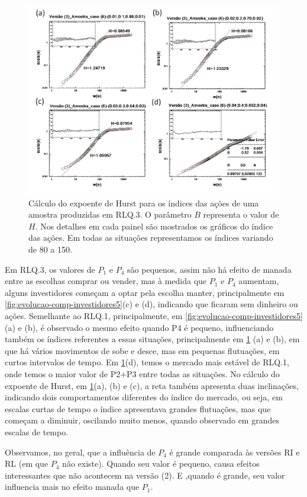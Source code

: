 \documentclass[brazil,ruledheader]{abnt}
\begin{document}
\begin{figure}[!h]
\centering
\includegraphics[width=0.8\linewidth]{Figuras/23.jpg}
\caption[Cálculo do expoente de Hurst para os índices em RLQ.3]{Cálculo do
expoente de Hurst para os índices das ações de uma amostra
produzidas em RLQ.3.  O parâmetro $B$ representa o valor de
$H$. Nos detalhes em cada painel são mostrados os gráficos do índice das ações.
Em todas as situações representamos os índices variando de 80 a 150.}
\label{fig:calculo-exp-hurst9}
\end{figure}

Em RLQ.3, os valores de $P_1$ e $P_4$ são pequenos, assim não há efeito de
manada entre as escolhas comprar ou vender, mas à medida que $P_1$ e $P_4$
aumentam, alguns investidores  começam a optar pela escolha manter,
principalmente em \ref{fig:evolucao-comp-investidores5}(c) e (d), indicando que
ficaram sem dinheiro ou ações. Semelhante ao RLQ.1, principalmente, em
\ref{fig:evolucao-comp-investidores5}(a) e (b), é observado o mesmo efeito
 quando P4 é pequeno, influenciando também os índices referentes a
essas situações, principalmente em \ref{fig:calculo-exp-hurst9} (a) e (b), em
que há vários movimentos de sobe e desce, mas em pequenas flutuações, em curtos
intervalos de tempo. Em \ref{fig:calculo-exp-hurst9}(d), temos o mercado mais
estável de RLQ.1, onde temos o maior valor de P2+P3 entre todas as situações.
No cálculo do expoente de Hurst, em \ref{fig:calculo-exp-hurst9}(a), (b) e (c),
a reta também apresenta duas inclinações, indicando dois comportamentos
diferentes do índice do mercado, ou seja, em escalas curtas de tempo o índice
apresentava grandes flutuações, mas que começam a diminuir, oscilando
muito menos, quando observado em grandes escalas de tempo.

Observamos, no geral, que a influência de $P_4$ é grande comparada às versões
RI e RL (em que $P_4$ não existe). Quando seu valor é pequeno, causa efeitos
interessantes que não acontecem na versão (2). E ,quando é grande, seu valor
influencia mais no efeito manada que  $P_1$.
\end{document}
